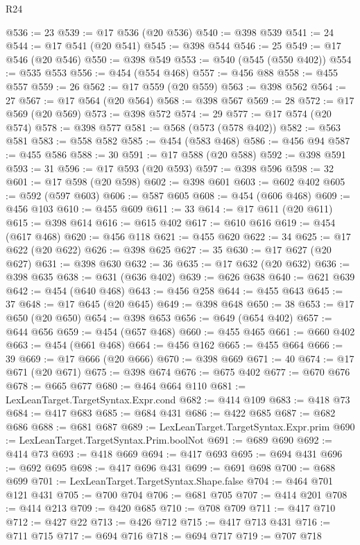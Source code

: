 \begin{lexlean}{R24}
\begin{coremodule}
@536 := 23
@539 := @17 @536 (@20 @536)
@540 := @398 @539
@541 := 24
@544 := @17 @541 (@20 @541)
@545 := @398 @544
@546 := 25
@549 := @17 @546 (@20 @546)
@550 := @398 @549
@553 := @540 (@545 (@550 @402))
@554 := @535 @553
@556 := @454 (@554 @468)
@557 := @456 @88
@558 := @455 @557
@559 := 26
@562 := @17 @559 (@20 @559)
@563 := @398 @562
@564 := 27
@567 := @17 @564 (@20 @564)
@568 := @398 @567
@569 := 28
@572 := @17 @569 (@20 @569)
@573 := @398 @572
@574 := 29
@577 := @17 @574 (@20 @574)
@578 := @398 @577
@581 := @568 (@573 (@578 @402))
@582 := @563 @581
@583 := @558 @582
@585 := @454 (@583 @468)
@586 := @456 @94
@587 := @455 @586
@588 := 30
@591 := @17 @588 (@20 @588)
@592 := @398 @591
@593 := 31
@596 := @17 @593 (@20 @593)
@597 := @398 @596
@598 := 32
@601 := @17 @598 (@20 @598)
@602 := @398 @601
@603 := @602 @402
@605 := @592 (@597 @603)
@606 := @587 @605
@608 := @454 (@606 @468)
@609 := @456 @103
@610 := @455 @609
@611 := 33
@614 := @17 @611 (@20 @611)
@615 := @398 @614
@616 := @615 @402
@617 := @610 @616
@619 := @454 (@617 @468)
@620 := @456 @118
@621 := @455 @620
@622 := 34
@625 := @17 @622 (@20 @622)
@626 := @398 @625
@627 := 35
@630 := @17 @627 (@20 @627)
@631 := @398 @630
@632 := 36
@635 := @17 @632 (@20 @632)
@636 := @398 @635
@638 := @631 (@636 @402)
@639 := @626 @638
@640 := @621 @639
@642 := @454 (@640 @468)
@643 := @456 @258
@644 := @455 @643
@645 := 37
@648 := @17 @645 (@20 @645)
@649 := @398 @648
@650 := 38
@653 := @17 @650 (@20 @650)
@654 := @398 @653
@656 := @649 (@654 @402)
@657 := @644 @656
@659 := @454 (@657 @468)
@660 := @455 @465
@661 := @660 @402
@663 := @454 (@661 @468)
@664 := @456 @162
@665 := @455 @664
@666 := 39
@669 := @17 @666 (@20 @666)
@670 := @398 @669
@671 := 40
@674 := @17 @671 (@20 @671)
@675 := @398 @674
@676 := @675 @402
@677 := @670 @676
@678 := @665 @677
@680 := @464 @664 @110
@681 := LexLeanTarget.TargetSyntax.Expr.cond
@682 := @414 @109
@683 := @418 @73
@684 := @417 @683
@685 := @684 @431
@686 := @422 @685
@687 := @682 @686
@688 := @681 @687
@689 := LexLeanTarget.TargetSyntax.Expr.prim
@690 := LexLeanTarget.TargetSyntax.Prim.boolNot
@691 := @689 @690
@692 := @414 @73
@693 := @418 @669
@694 := @417 @693
@695 := @694 @431
@696 := @692 @695
@698 := @417 @696 @431
@699 := @691 @698
@700 := @688 @699
@701 := LexLeanTarget.TargetSyntax.Shape.false
@704 := @464 @701 @121 @431
@705 := @700 @704
@706 := @681 @705
@707 := @414 @201
@708 := @414 @213
@709 := @420 @685
@710 := @708 @709
@711 := @417 @710
@712 := @427 @22
@713 := @426 @712
@715 := @417 @713 @431
@716 := @711 @715
@717 := @694 @716
@718 := @694 @717
@719 := @707 @718

\end{coremodule}
\end{lexlean}
